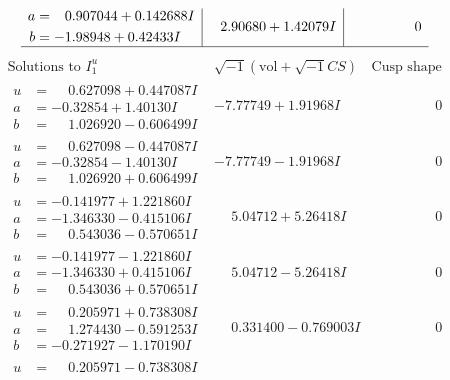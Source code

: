 \documentclass[1p]{elsarticle_modified}
\theoremstyle{definition}
\newcommand{\I}{\sqrt{-1}}
\begin{document}
$$\begin{array}{c|c|c}
\begin{aligned}
a &= \phantom{-}0.907044 + 0.142688 I \\
b &= -1.98948 + 0.42433 I\end{aligned}
 & \phantom{-}2.90680 + 1.42079 I & \phantom{-0.000000 } 0\\
 \hline 
 \end{array}$$\newpage$$\begin{array}{c|c|c}  
\text{Solutions to }I^u_{1}& \I (\text{vol} + \sqrt{-1}CS) & \text{Cusp shape}\\
 \hline 
\begin{aligned}
u &= \phantom{-}0.627098 + 0.447087 I \\
a &= -0.32854 + 1.40130 I \\
b &= \phantom{-}1.026920 - 0.606499 I\end{aligned}
 & -7.77749 + 1.91968 I & \phantom{-0.000000 } 0 \\ \hline\begin{aligned}
u &= \phantom{-}0.627098 - 0.447087 I \\
a &= -0.32854 - 1.40130 I \\
b &= \phantom{-}1.026920 + 0.606499 I\end{aligned}
 & -7.77749 - 1.91968 I & \phantom{-0.000000 } 0 \\ \hline\begin{aligned}
u &= -0.141977 + 1.221860 I \\
a &= -1.346330 - 0.415106 I \\
b &= \phantom{-}0.543036 - 0.570651 I\end{aligned}
 & \phantom{-}5.04712 + 5.26418 I & \phantom{-0.000000 } 0 \\ \hline\begin{aligned}
u &= -0.141977 - 1.221860 I \\
a &= -1.346330 + 0.415106 I \\
b &= \phantom{-}0.543036 + 0.570651 I\end{aligned}
 & \phantom{-}5.04712 - 5.26418 I & \phantom{-0.000000 } 0 \\ \hline\begin{aligned}
u &= \phantom{-}0.205971 + 0.738308 I \\
a &= \phantom{-}1.274430 - 0.591253 I \\
b &= -0.271927 - 1.170190 I\end{aligned}
 & \phantom{-}0.331400 - 0.769003 I & \phantom{-0.000000 } 0 \\ \hline\begin{aligned}
u &= \phantom{-}0.205971 - 0.738308 I \\

\end{aligned}
\end{array}$$
\end{document}
